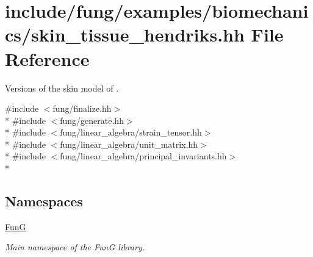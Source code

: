\hypertarget{skin__tissue__hendriks_8hh}{\section{include/fung/examples/biomechanics/skin\-\_\-tissue\-\_\-hendriks.hh File Reference}
\label{skin__tissue__hendriks_8hh}
}


Versions of the skin model of \cite{Hendriks2005}.  


{\ttfamily \#include $<$fung/finalize.\-hh$>$}\\*
{\ttfamily \#include $<$fung/generate.\-hh$>$}\\*
{\ttfamily \#include $<$fung/linear\-\_\-algebra/strain\-\_\-tensor.\-hh$>$}\\*
{\ttfamily \#include $<$fung/linear\-\_\-algebra/unit\-\_\-matrix.\-hh$>$}\\*
{\ttfamily \#include $<$fung/linear\-\_\-algebra/principal\-\_\-invariants.\-hh$>$}\\*
\subsection*{Namespaces}
\begin{DoxyCompactItemize}
\item 
\hyperlink{namespaceFunG}{Fun\-G}
\begin{DoxyCompactList}\small\item\em Main namespace of the Fun\-G library. \end{DoxyCompactList}\end{DoxyCompactItemize}
